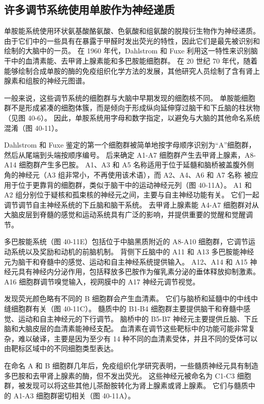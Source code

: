 \subsection{许多调节系统使用单胺作为神经递质}
单胺能系统使用环状氨基酸酪氨酸、色氨酸和组氨酸的脱羧衍生物作为神经递质。 由于它们中的一些具有在暴露于甲醛时发出荧光的特性，因此它们是最先被识别和绘制的大脑中的一员。 在 1960 年代，Dahlstrom 和 Fuxe 利用这一特性来识别脑干中的血清素能、去甲肾上腺素能和多巴胺能细胞群。 在 20 世纪 70 年代，随着能够绘制合成单胺的酶的免疫组织化学方法的发展，其他研究人员绘制了含有肾上腺素和组胺的神经元图谱。

一般来说，这些调节系统的细胞群与大脑中早期发现的细胞核不同。 单胺能细胞群不是形成紧凑的细胞体簇，而是倾向于形成纵向延伸穿过脑干和下丘脑的柱状物（见图 40-6）。 因此，单胺系统用字母和数字指定，以避免与大脑的其他命名系统混淆（图 40-11）。

Dahlstrom 和 Fuxe 鉴定的第一个细胞群被简单地按字母顺序识别为“A”细胞群，然后从尾端到头端按顺序编号。 后来确定 A1-A7 细胞群产生去甲肾上腺素，A8-A14 细胞群产生多巴胺。 A1、A3 和 A5 名称适用于位于延髓和脑桥被盖腹外侧角的神经元（A3 组非常小，不再使用该术语），而 A2、A4、A6 和 A7 名称 被应用于位于更靠背的细胞群，类似于脑干中的运动神经元列（图 40-11A）。 A1 和 A2 组分别位于疑核和孤束核的神经元之间，主要与自主神经功能有关。 它们一起调节调节自主神经系统的下丘脑和脑干系统。 去甲肾上腺素能 A4-A7 细胞群对从大脑皮层到脊髓的感觉和运动系统具有广泛的影响，并提供重要的觉醒和觉醒调节。

多巴胺能系统（图 40-11E）包括位于中脑黑质附近的 A8-A10 细胞群，它调节运动系统以及奖励和动机的前脑机制。 背侧下丘脑中的 A11 和 A13 多巴胺能神经元为脑干和脊髓中的感觉、运动和自主神经系统提供输入。 A12、A14 和 A15 神经元具有神经内分泌作用，包括释放多巴胺作为催乳素分泌的垂体释放抑制激素。 A16 细胞群调节嗅觉输入，视网膜中的 A17 神经元调节视觉。

发现荧光颜色略有不同的 B 细胞群会产生血清素。 它们与脑桥和延髓中的中线中缝细胞群有关（图 40-11C）。 髓质中的 B1-B4 细胞群主要提供脑干和脊髓中感觉、运动和自主神经元的下行调节。 脑桥中的 B5-B7 神经元主要提供丘脑、下丘脑和大脑皮层的血清素能神经支配。 血清素在调节这些靶标中的功能可能非常复杂，难以破译，主要是因为至少有 14 种不同的血清素受体，并且不同的受体可以由靶标区域中的不同细胞类型表达。

在命名 A 和 B 细胞群几年后，免疫组织化学研究表明，一些髓质神经元具有制造多巴胺和去甲肾上腺素的酶，但不发出荧光。 这些神经元被命名为 C1-C3 细胞群，被发现可以将这些其他儿茶酚胺转化为肾上腺素或肾上腺素。 它们与髓质中的 A1-A3 细胞群密切相关（图 40-11A）。

